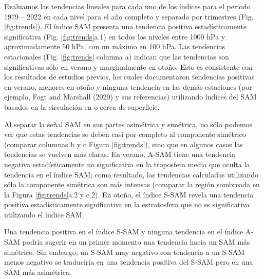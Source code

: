 \documentclass[12pt,oneside]{reedthesis}
\begin{document}
Evaluamos las tendencias lineales para cada uno de los índices para el periodo 1979 -- 2022 en cada nivel para el año completo y separado por trimestres (Fig. \ref{fig:trends}).
El índice SAM presenta una tendencia positiva estadísticamente significativa (Fig. \ref{fig:trends}a.1) en todos los niveles entre 1000 hPa y aproximadamente 50 hPa, con un máximo en 100 hPa.
Las tendencias estacionales (Fig. \ref{fig:trends} columna a) indican que las tendencias son significativas sólo en verano y marginalmente en otoño.
Esto es consistente con los resultados de estudios previos, los cuales documentaron tendencias positivas en verano, menores en otoño y ninguna tendencia en las demás estaciones (por ejemplo, Fogt and Marshall (2020) y sus referencias) utilizando índices del SAM basados en la circulación en o cerca de superficie.

Al separar la señal SAM en sus partes asimétrica y simétrica, no sólo podemos ver que estas tendencias se deben casi por completo al componente simétrico (comparar columnas b y c Figura \ref{fig:trends}), sino que en algunos casos las tendencias se vuelven más claras.
En verano, A-SAM tiene una tendencia negativa estadísticamente no significativa en la troposfera media que oculta la tendencia en el índice SAM; como resultado, las tendencias calculadas utilizando sólo la componente simétrica son más intensas (comparar la región sombreada en la Figura \ref{fig:trends}a.2 y c.2).
En otoño, el índice S-SAM revela una tendencia positiva estadísticamente significativa en la estratosfera que no es significativa utilizando el índice SAM.

Una tendencia positiva en el índice S-SAM y ninguna tendencia en el índice A-SAM podría sugerir en un primer momento una tendencia hacia un SAM más simétrico.
Sin embargo, un S-SAM muy negativo con tendencia a un S-SAM menos negativo se traduciría en una tendencia positiva del S-SAM pero en una SAM más asimétrica.
\end{document}
